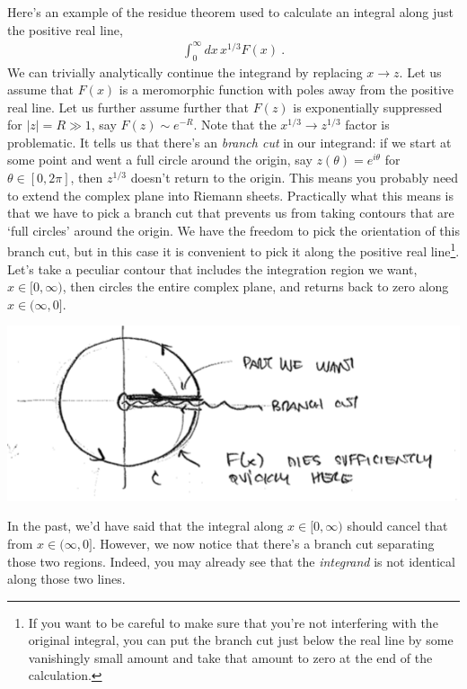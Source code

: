  Here's an example of the residue theorem used to calculate an integral along just the positive real line,
 \begin{align}
 	\int_0^\infty dx\, x^{1/3} F(x) \ .
 \end{align}
 We can trivially analytically continue the integrand by replacing $x\to z$. Let us assume that $F(x)$ is a meromorphic function with poles away from the positive real line. Let us further assume further that $F(z)$ is exponentially suppressed for $|z| = R \gg 1$, say $F(z)\sim e^{-R}$. Note that the $x^{1/3} \to z^{1/3}$ factor is problematic. It tells us that there's an \emph{branch cut} in our integrand: if we start at some point and went a full circle around the origin, say $z(\theta) = e^{i\theta}$ for $\theta\in[0,2\pi]$, then $z^{1/3}$ doesn't return to the origin. This means you probably need to extend the complex plane into Riemann sheets. Practically what this means is that we have to pick a branch cut that prevents us from taking contours that are `full circles' around the origin. We have the freedom to pick the orientation of this branch cut, but in this case it is convenient to pick it along the positive real line\footnote{If you want to be careful to make sure that you're not interfering with the original integral, you can put the branch cut just below the real line by some vanishingly small amount and take that amount to zero at the end of the calculation.}. Let's take a peculiar contour that includes the integration region we want, $x\in [0,\infty)$, then circles the entire complex plane, and returns back to zero along $x\in (\infty, 0]$. 
 \begin{center}
 \includegraphics[width=.8\textwidth]{figures/Lec_2017_14_branch.png}
 \end{center}
 In the past, we'd have said that the integral along $x\in [0, \infty)$ should cancel that from $x\in (\infty, 0]$. However, we now notice that there's a branch cut separating those two regions. Indeed, you may already see that the \emph{integrand} is not identical along those two lines. 

